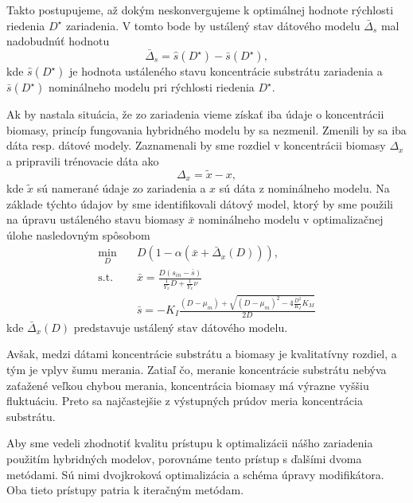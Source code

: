 Takto postupujeme, až dokým neskonvergujeme k optimálnej hodnote rýchlosti riedenia $ D^{\star} $ zariadenia. V tomto bode by ustálený stav dátového modelu $ \bar{\Delta}_s $ mal nadobudnúť hodnotu
\begin{equation}
	\bar{\Delta}_s = \hat{s}\left(D^{\star}\right) - \bar{s}\left(D^{\star}\right),
\end{equation} 
kde $ \hat{s}\left(D^{\star}\right) $ je hodnota ustáleného stavu koncentrácie substrátu zariadenia a $ \bar{s}\left(D^{\star}\right) $ nominálneho modelu pri rýchlosti riedenia $ D^{\star} $.

Ak by nastala situácia, že zo zariadenia vieme získať iba údaje o koncentrácii biomasy, princíp fungovania hybridného modelu by sa nezmenil. Zmenili by sa iba dáta resp. dátové modely. Zaznamenali by sme rozdiel v koncentrácii biomasy $ \Delta_{x} $ a pripravili trénovacie dáta ako
\begin{equation}
	\Delta_{x} = \tilde{x} - x,
\end{equation} 
kde $ \tilde{x} $ sú namerané údaje zo zariadenia a $ x $ sú dáta z nominálneho modelu. Na základe týchto údajov by sme identifikovali dátový model, ktorý by sme použili na úpravu ustáleného stavu biomasy $ \bar{x} $ nominálneho modelu v optimalizačnej úlohe nasledovným spôsobom
\begin{equation}
\label{eq:hybrid_opt_bio}
	\begin{split}
		\min_{D} &\quad D\left(1-\alpha\left(\bar{x}+\bar{\Delta}_{x}(D)\right)\right), \\
		\text{s.t.} &\quad \bar{x} = \frac{D\left(s_{in}-\bar{s}\right)}{\frac{1}{Y_{x}}D + \frac{1}{Y_{x}}\nu} \\
		&\quad \bar{s} = -K_{I}\frac{\left(D-\mu_{m}\right) + \sqrt{\left(D-\mu_{m}\right)^2 - 4\frac{D^2}{K_{I}}K_{M}}}{2D}
	\end{split}
\end{equation}
kde $ \bar{\Delta}_{x}(D) $ predstavuje ustálený stav dátového modelu.

Avšak, medzi dátami koncentrácie substrátu a biomasy je kvalitatívny rozdiel, a tým je vplyv šumu merania. Zatiaľ čo, meranie koncentrácie substrátu nebýva zaťažené veľkou chybou merania, koncentrácia biomasy má výrazne vyššiu fluktuáciu. Preto sa najčastejšie z výstupných prúdov meria koncentrácia substrátu. 

Aby sme vedeli zhodnotiť kvalitu prístupu k optimalizácii nášho zariadenia použitím hybridných modelov, porovnáme tento prístup s ďalšími dvoma metódami. Sú nimi dvojkroková optimalizácia a schéma úpravy modifikátora. Oba tieto prístupy patria k iteračným metódam.

